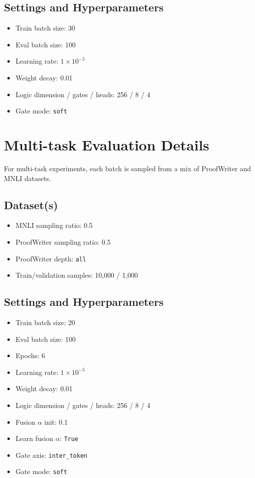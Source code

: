 \documentclass[10pt,twocolumn,letterpaper]{article}
\begin{document}
\subsection{Settings and Hyperparameters}
\begin{itemize}
\item Train batch size: 30
\item Eval batch size: 100
\item Learning rate: $1\times10^{-5}$
\item Weight decay: 0.01
\item Logic dimension / gates / heads: 256 / 8 / 4
\item Gate mode: \texttt{soft}
\end{itemize}


\section{Multi-task Evaluation Details}
For multi-task experiments, each batch is sampled from a mix
of ProofWriter and MNLI datasets.

\subsection{Dataset(s)}
\begin{itemize}
\item MNLI sampling ratio: 0.5
\item ProofWriter sampling ratio: 0.5
\item ProofWriter depth: \texttt{all}
\item Train/validation samples: 10,000 / 1,000
\end{itemize}

\subsection{Settings and Hyperparameters}
\begin{itemize}
\item Train batch size: 20
\item Eval batch size: 100
\item Epochs: 6
\item Learning rate: $1\times10^{-5}$
\item Weight decay: 0.01
\item Logic dimension / gates / heads: 256 / 8 / 4
\item Fusion $\alpha$ init: 0.1
\item Learn fusion $\alpha$: \texttt{True}
\item Gate axis: \texttt{inter\_token}
\item Gate mode: \texttt{soft}
\end{itemize}
\end{document}
